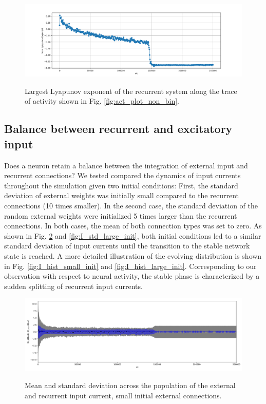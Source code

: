 \documentclass[10pt,a4paper]{article}
\begin{document}
\begin{figure}
\includegraphics[width=\textwidth]{../../code/rnn_prox_dist_non_bin/plots/plastic_input_weights_small_init/lyapunov_exponents.png}
\label{fig:lyap_exp}
\caption{Largest Lyapunov exponent of the recurrent system along the trace of activity shown in Fig. \ref{fig:act_plot_non_bin}.}
\end{figure}

\subsection{Balance between recurrent and excitatory input}

Does a neuron retain a balance between the integration of external input and recurrent connections? We tested compared the dynamics of input currents throughout the simulation given two initial conditions: First, the standard deviation of external weights was initially small compared to the recurrent connections (10 times smaller). In the second case, the standard deviation of the random external weights were initialized 5 times larger than the recurrent connections. In both cases, the mean of both connection types was set to zero. As shown in Fig. \ref{fig:I_std_small_init} and \ref{fig:I_std_large_init}, both initial conditions led to a similar standard deviation of input currents until the transition to the stable network state is reached. A more detailed illustration of the evolving distribution is shown in Fig. \ref{fig:I_hist_small_init} and \ref{fig:I_hist_large_init}. Corresponding to our observation with respect to neural activity, the stable phase is characterized by a sudden splitting of recurrent input currents.

\begin{figure}
\includegraphics[width=\textwidth]{../../code/rnn_prox_dist_non_bin/plots/plastic_input_weights_small_init/I_ee_I_eext_mean_std.png}
\label{fig:I_std_small_init}
\caption{Mean and standard deviation across the population of the external and recurrent input current, small initial external connections.}
\end{figure}
\end{document}
